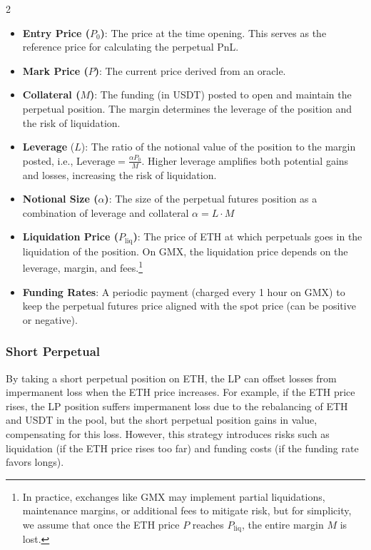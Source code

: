 \documentclass[12pt]{article}
\begin{document}
\begin{multicols}{2}
\begin{itemize}
	\item \textbf{Entry Price ($P_0$)}: The price at the time opening. This serves as the reference price for calculating the perpetual PnL.
	\item \textbf{Mark Price ($P$)}: The current price derived from an oracle.	
	\item \textbf{Collateral ($M$)}: The funding (in USDT) posted to open and maintain the perpetual position. The margin determines the leverage of the position and the risk of liquidation.
	\item \textbf{Leverage} ($L$): The ratio of the notional value of the position to the margin posted, i.e., $\text{Leverage} = \frac{\alpha P_0}{M}$. Higher leverage amplifies both potential gains and losses, increasing the risk of liquidation.
	\item \textbf{Notional Size ($\alpha$)}: The size of the perpetual futures position as a combination of leverage and collateral  $\alpha = L \cdot M$
	\item \textbf{Liquidation Price ($P_{\mathrm{liq}}$)}: The price of ETH at which perpetuals goes in the liquidation of the position. On GMX, the liquidation price depends on the leverage, margin, and fees.\footnote{In practice, exchanges like GMX may implement partial liquidations, maintenance margins, or additional fees to mitigate risk, but for simplicity, we assume that once the ETH price $P$ reaches $P_{\mathrm{liq}}$, the entire margin $M$ is lost.}
	\item \textbf{Funding Rates}: A periodic payment (charged every 1 hour on GMX) to keep the perpetual futures price aligned with the spot price (can be positive or negative).

\end{itemize}

\subsubsection{Short Perpetual}
By taking a short perpetual position on ETH, the LP can offset losses from impermanent loss when the ETH price increases. For example, if the ETH price rises, the LP position suffers impermanent loss due to the rebalancing of ETH and USDT in the pool, but the short perpetual position gains in value, compensating for this loss. However, this strategy introduces risks such as liquidation (if the ETH price rises too far) and funding costs (if the funding rate favors longs). 

\end{multicols}
\end{document}
